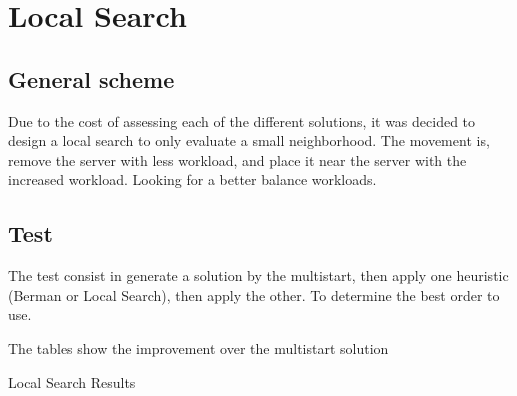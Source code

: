 \section{Local Search}
\subsection{General scheme}
\begin{frame}
  Due to the cost of assessing each of the different solutions, it was decided
  to design a local search to only evaluate a small neighborhood.
  The movement is, remove the server with less workload,
  and place it near the server with the increased workload.
  Looking for a better balance workloads.
\end{frame}
\subsection{Test}
\begin{frame}
  The test consist in 
  generate a solution by the multistart,
  then apply one heuristic (Berman or Local Search),
  then apply the other.
  To determine the best order to use.

  The tables show the improvement over the multistart solution
\end{frame}

\begin{frame}[allowframebreaks]{Local Search Results}{}
  
\end{frame}
